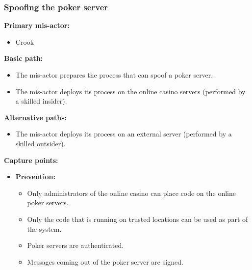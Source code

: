 \documentclass[a4paper,11pt]{report}
\begin{document}
\subsubsection{Spoofing the poker server}
\label{PokerServerCasesS}
\textbf{Primary mis-actor:}
\begin{itemize}
\item Crook
\end{itemize}
\textbf{Basic path:}
\begin{itemize}
\item The mis-actor prepares the process that can spoof a poker server.
\item The mis-actor deploys its process on the online casino servers (performed by a skilled insider).
\end{itemize}
\textbf{Alternative paths:}
\begin{itemize}
\item The mis-actor deploys its process on an external server (performed by a skilled outsider).
\end{itemize}
\textbf{Capture points:}
\begin{itemize}
\item \textbf{Prevention:}
\begin{itemize}
\item Only administrators of the online casino can place code on the online poker servers.
\item Only the code that is running on trusted locations can be used as part of the system.
\item Poker servers are authenticated.
\item Messages coming out of the poker server are signed.
\end{itemize}
\end{itemize}
\end{document}
